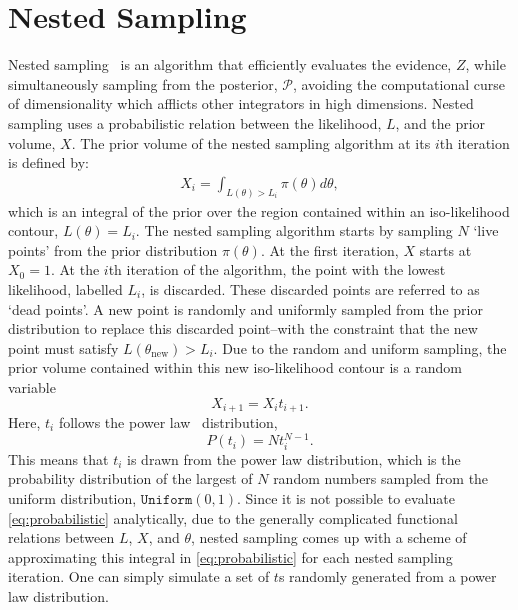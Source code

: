 \section{Nested Sampling}\label{section:NSmath}

Nested sampling~\cite{10.1214/06-BA127} is an algorithm that efficiently evaluates the evidence, $Z$, while simultaneously sampling from the posterior, $\mathcal{P}$, avoiding the computational curse of dimensionality which afflicts other integrators in high dimensions. Nested sampling uses a probabilistic relation between the likelihood, $L$, and the prior volume, $X$. The prior volume of the nested sampling algorithm at its $i$th iteration is defined by:
%
\begin{align}
X_i = \int_{L(\theta)> L_i} \pi(\theta)d\theta,
\label{eq:probabilistic}
\end{align}
%
which is an integral of the prior over the region contained within an iso-likelihood contour, $L(\theta)=L_{i}$. 
The nested sampling algorithm starts by sampling $N$ `live points' from the prior distribution $\pi(\theta)$. At the first iteration, $X$ starts at $X_0=1$. At the $i$th iteration of the algorithm, the point with the lowest likelihood, labelled $L_i$, is discarded. These discarded points are referred to as `dead points'. A new point is randomly and uniformly sampled from the prior distribution to replace this discarded point--with the constraint that the new point must satisfy $L(\theta_{\mathrm{new}})>L_i$. Due to the random and uniform sampling, the prior volume contained within this new iso-likelihood contour is a random variable 
%
\begin{equation}
X_{i+1}=X_{i}t_{i+1}.
\end{equation}
%
Here, $t_i$ follows the power law~\cite{Clauset_2009} distribution, 
\begin{equation}
P(t_i)=Nt_i^{N-1}.
\end{equation}
This means that $t_i$ is drawn from the power law distribution, which is the probability distribution of the largest of $N$ random numbers sampled from the uniform distribution, $\texttt{Uniform} (0,1)$. Since it is not possible to evaluate \cref{eq:probabilistic} analytically, due to the generally complicated functional relations between $L$, $X$, and $\theta$, nested sampling comes up with a scheme of approximating this integral in \cref{eq:probabilistic} for each nested sampling iteration. One can simply simulate a set of $t$s randomly generated from a power law distribution. 

